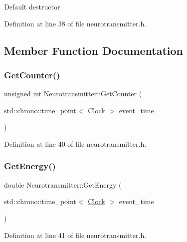 Default destructor 

Definition at line 38 of file neurotransmitter.\+h.



\subsection{Member Function Documentation}
\mbox{\label{class_neurotransmitter_a94b3d1909cdd787f0583e28e1e9b58dd}} 
\subsubsection{\texorpdfstring{Get\+Counter()}{GetCounter()}}
{\footnotesize\ttfamily unsigned int Neurotransmitter\+::\+Get\+Counter (\begin{DoxyParamCaption}\item[{std\+::chrono\+::time\+\_\+point$<$ \mbox{\hyperlink{universe_8h_a0ef8d951d1ca5ab3cfaf7ab4c7a6fd80}{Clock}} $>$}]{event\+\_\+time }\end{DoxyParamCaption})\hspace{0.3cm}{\ttfamily [inline]}}



Definition at line 40 of file neurotransmitter.\+h.

\mbox{\label{class_neurotransmitter_a1e3e8134ea935f617b0afd2f7b5b5799}} 
\subsubsection{\texorpdfstring{Get\+Energy()}{GetEnergy()}}
{\footnotesize\ttfamily double Neurotransmitter\+::\+Get\+Energy (\begin{DoxyParamCaption}\item[{std\+::chrono\+::time\+\_\+point$<$ \mbox{\hyperlink{universe_8h_a0ef8d951d1ca5ab3cfaf7ab4c7a6fd80}{Clock}} $>$}]{event\+\_\+time }\end{DoxyParamCaption})\hspace{0.3cm}{\ttfamily [inline]}}



Definition at line 41 of file neurotransmitter.\+h.

